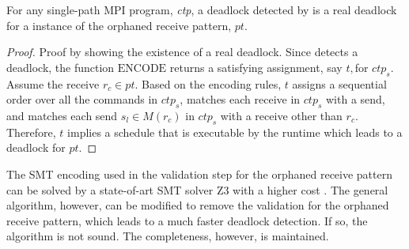 \begin{lemma}
For any single-path MPI program, \textit{ctp}, a deadlock detected by  is a real deadlock for a instance of the orphaned receive pattern, $\mathit{pt}$. 
\label{lemma:mismatch}
\end{lemma}
\begin{proof}
Proof by showing the existence of a real deadlock. Since  detects a deadlock, the function $\mathrm{ENCODE}$ returns a satisfying assignment, say $\mathit{t}, $for $ctp_s$.  Assume the receive $r_c \in pt$. Based on the encoding rules, $\mathit{t}$ assigns a sequential order over all the commands in $ctp_s$, matches each receive in $ctp_s$ with a send, and matches each send $\mathit{s_l}\in\mathit{M}(\mathit{r_c})$ in $\mathit{ctp_s}$ with a receive other than $r_c$. Therefore, $\mathit{t}$ implies a schedule that is executable by the runtime which leads to a deadlock for $pt$.
\end{proof}

The SMT encoding used in the validation step for the orphaned receive pattern can be solved by a state-of-art SMT solver Z3 with a higher cost \cite{demoura:tacas08}. The general algorithm, however, can be modified to remove the validation for the orphaned receive pattern, which leads to a much faster deadlock detection. If so, the algorithm is not sound. The completeness, however, is maintained.


